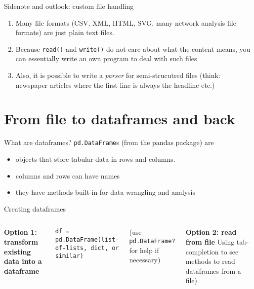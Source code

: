 \begin{frame}{Sidenote and outlook: custom file handling}
\begin{enumerate}
	\item Many file formats (CSV, XML, HTML, SVG, many network analysis file formats) are just plain text files.
	\item Because \texttt{read()} and \texttt{write()} do not care about what the content means, you can essentially write an own program to deal with such files
	\item Also, it is possible to write a \emph{parser} for semi-strucutred files (think: newspaper articles where the first line is always the headline etc.)
\end{enumerate}
	
\end{frame}






\section{From file to dataframes and back}


\begin{frame}{What are dataframes?}
	\texttt{pd.DataFrame}s (from the pandas package) are
	\begin{itemize}
		\item objects that store tabular data in rows and columns.
		\item columns and rows can have names
		\item they have methods built-in for data wrangling and analysis
	\end{itemize}
	
\end{frame}

\begin{frame}{Creating dataframes}
	\begin{columns}[T]
		\textbf{Option 1: transform existing data into a dataframe}
		
		\texttt{df = pd.DataFrame(list-of-lists, dict, or similar)}
		
		(use \texttt{pd.DataFrame?} for help if necessary)
		
		\textbf{Option 2: read from file}
		Using tab-completion to see methods to read dataframes from a file)
	\end{columns}
\end{frame}

